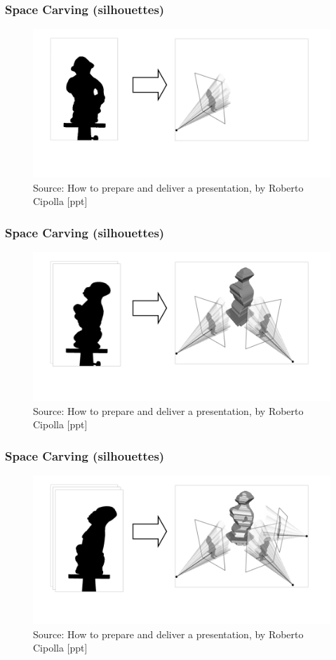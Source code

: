 \documentclass{beamer}
\begin{document}
\begin{frame}
  \frametitle{Space Carving (silhouettes)}
  \begin{figure}[htb!]
   \centering
   \includegraphics[width=1.0\textwidth]{img/carving1}
   \caption*{\tiny Source: How to prepare and deliver a presentation, by Roberto Cipolla [ppt]}
   \label{fig:carving1}
  \end{figure}
\end{frame}
\begin{frame}
  \frametitle{Space Carving (silhouettes)}
  \begin{figure}[htb!]
   \centering
   \includegraphics[width=1.0\textwidth]{img/carving2}
   \caption*{\tiny Source: How to prepare and deliver a presentation, by Roberto Cipolla [ppt]}
   \label{fig:carving2}
  \end{figure}
\end{frame}
\begin{frame}
  \frametitle{Space Carving (silhouettes)}
  \begin{figure}[htb!]
   \centering
   \includegraphics[width=1.0\textwidth]{img/carving3}
   \caption*{\tiny Source: How to prepare and deliver a presentation, by Roberto Cipolla [ppt]}
   \label{fig:carving3}
  \end{figure}
\end{frame}
\end{document}
